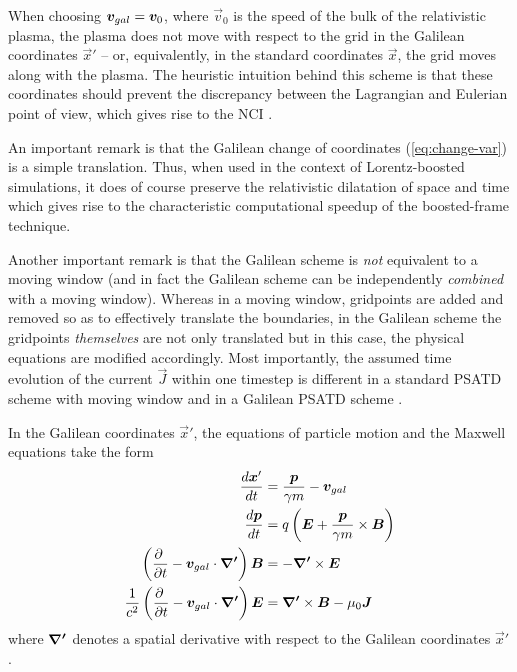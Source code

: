 When choosing $\boldsymbol{v}_{gal}= \boldsymbol{v}_0$, where
$\vec{v}_0$ is the speed of the bulk of the relativistic
plasma, the plasma does not move with respect to the grid in the Galilean
coordinates $\vec{x}'$ -- or, equivalently, in the standard
coordinates $\vec{x}$, the grid moves along with the plasma. The heuristic intuition behind this scheme
is that these coordinates should prevent the discrepancy between the Lagrangian and
Eulerian point of view, which gives rise to the NCI \cite{Godfreyjcp75}.

An important remark is that the Galilean change of
coordinates (\ref{eq:change-var}) is a simple translation. Thus, when used in
the context of Lorentz-boosted simulations, it does
of course preserve the relativistic dilatation of space and time which gives rise to the
characteristic computational speedup of the boosted-frame technique.

Another important remark is that the Galilean scheme is \emph{not}
equivalent to a moving window (and in fact the Galilean scheme can be
independently \emph{combined} with a moving window). Whereas in a
moving window, gridpoints are added and removed so as to effectively
translate the boundaries, in the Galilean scheme the gridpoints
\emph{themselves} are not only translated but in this case, the physical equations
are modified accordingly. Most importantly, the assumed time evolution of
the current $\vec{J}$ within one timestep is different in a standard PSATD scheme with moving
window and in a Galilean PSATD scheme \cite{LeheARXIV2016}.

In the Galilean coordinates $\vec{x}'$, the equations of particle
motion and the Maxwell equations take the form
\begin{subequations}
\begin{align}
\frac{d\boldsymbol{x}'}{dt} &= \frac{\boldsymbol{p}}{\gamma m} - \boldsymbol{v}_{gal} \label{eq:motion1} \\
\frac{d\boldsymbol{p}}{dt} &= q \left( \boldsymbol{E} +
\frac{\boldsymbol{p}}{\gamma m} \times \boldsymbol{B} \right) \label{eq:motion2}\\
\left( \frac{\partial \;}{\partial t} - \boldsymbol{v}_{gal}\cdot\boldsymbol{\nabla'}\right)\boldsymbol{B} &= -\boldsymbol{\nabla'}\times\boldsymbol{E} \label{eq:maxwell1}\\
\frac{1}{c^2}\left( \frac{\partial \;}{\partial t} - \boldsymbol{v}_{gal}\cdot\boldsymbol{\nabla'}\right)\boldsymbol{E} &= \boldsymbol{\nabla'}\times\boldsymbol{B} - \mu_0\boldsymbol{J} \label{eq:maxwell2}
\end{align}
\end{subequations}
where $\boldsymbol{\nabla'}$ denotes a spatial derivative with respect to the
Galilean coordinates $\vec{x}'$.

